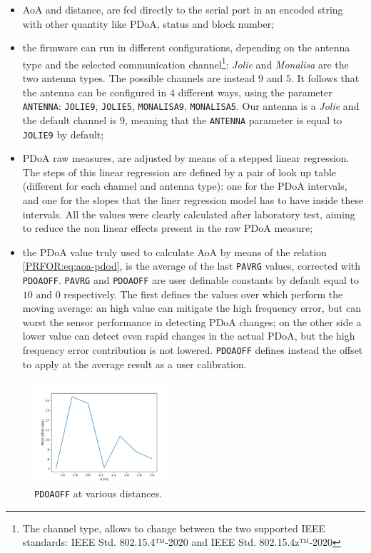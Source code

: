 \begin{itemize}
    \item AoA and distance, are fed directly to the serial port in an encoded string with other quantity like PDoA, status and block number;
    \item the firmware can run in different configurations, depending on the antenna type and the selected communication channel\footnote{The channel type, allows to change between the two supported IEEE standards: IEEE Std. 802.15.4™‐2020\cite{IEEEstd_4} and IEEE Std. 802.15.4z™‐2020\cite{IEEEstd_4z}}: \textit{Jolie} and \textit{Monalisa} are the two antenna types. The possible channels are instead $9$ and $5$. It follows that the antenna can be configured in $4$ different ways, using the parameter \texttt{ANTENNA}: \texttt{JOLIE9}, \texttt{JOLIE5}, \texttt{MONALISA9}, \texttt{MONALISA5}. Our antenna is a \textit{Jolie} and the default channel is $9$, meaning that the \texttt{ANTENNA} parameter is equal to \texttt{JOLIE9} by default;
    \item PDoA raw measures, are adjusted by means of a stepped linear regression. The steps of this linear regression are defined by a pair of look up table (different for each channel and antenna type): one for the PDoA intervals, and one for the slopes that the liner regression model has to have inside these intervals. All the values were clearly calculated after laboratory test, aiming to reduce the non linear effects present in the raw PDoA measure; 
    \item the PDoA value truly used to calculate AoA by means of the relation \eqref{PRFOR:eq:aoa-pdod}, is the average of the last \texttt{PAVRG} values, corrected with \texttt{PDOAOFF}. \texttt{PAVRG} and \texttt{PDOAOFF} are user definable constants by default equal to $10$ and $0$ respectively. The first defines the values over which perform the moving average: an high value can mitigate the high frequency error, but can worst the sensor performance in detecting PDoA changes; on the other side a lower value can detect even rapid changes in the actual PDoA, but the high frequency error contribution is not lowered. \texttt{PDOAOFF} defines instead the offset to apply at the average result as a user calibration.
\end{itemize}

\begin{figure}
    \centering
    \includegraphics[width=0.45\textwidth]{images/characterization/PDOAOFF_trend.png}
    \caption{\texttt{PDOAOFF} at various distances.}
    \label{UWB:fig:PDOAFF}
\end{figure}

